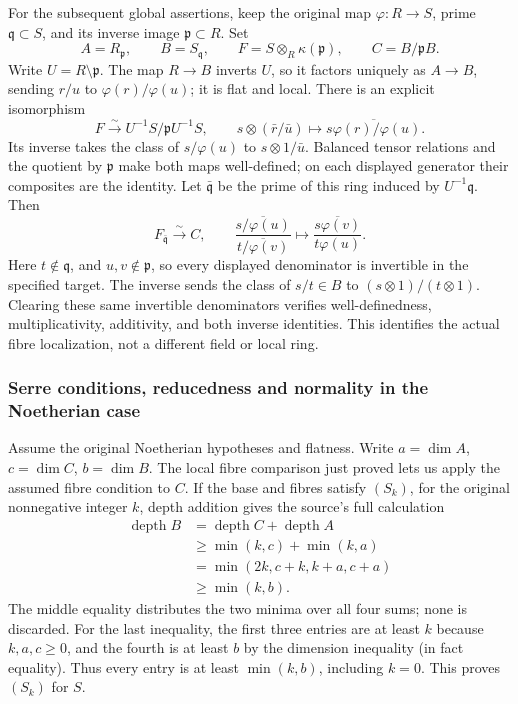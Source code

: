 For the subsequent global assertions, keep the original map \(\varphi:R\to S\), prime \(\mathfrak q\subset S\), and its inverse image \(\mathfrak p\subset R\). Set \[
 A=R_{\mathfrak p},\qquad B=S_{\mathfrak q},\qquad
 F=S\otimes_R\kappa(\mathfrak p),\qquad C=B/\mathfrak pB.
\] Write \(U=R\setminus\mathfrak p\). The map \(R\to B\) inverts \(U\), so it factors uniquely as \(A\to B\), sending \(r/u\) to \(\varphi(r)/\varphi(u)\); it is flat and local. There is an explicit isomorphism \[
 F\xrightarrow{\sim}U^{-1}S/\mathfrak pU^{-1}S,
 \qquad s\otimes(\bar r/\bar u)\longmapsto
 \overline{s\varphi(r)/\varphi(u)}.
\] Its inverse takes the class of \(s/\varphi(u)\) to \(s\otimes1/\bar u\). Balanced tensor relations and the quotient by \(\mathfrak p\) make both maps well-defined; on each displayed generator their composites are the identity. Let \(\bar{\mathfrak q}\) be the prime of this ring induced by \(U^{-1}\mathfrak q\). Then \[
 F_{\bar{\mathfrak q}}\xrightarrow{\sim}C,
 \qquad
 \frac{\overline{s/\varphi(u)}}{\overline{t/\varphi(v)}}
 \longmapsto\overline{\frac{s\varphi(v)}{t\varphi(u)}}.
\] Here \(t\notin\mathfrak q\), and \(u,v\notin\mathfrak p\), so every displayed denominator is invertible in the specified target. The inverse sends the class of \(s/t\in B\) to \((s\otimes1)/(t\otimes1)\). Clearing these same invertible denominators verifies well-definedness, multiplicativity, additivity, and both inverse identities. This identifies the actual fibre localization, not a different field or local ring.

\subsubsection{Serre conditions, reducedness and normality in the Noetherian case}\label{serre-conditions-reducedness-and-normality-in-the-noetherian-case}

Assume the original Noetherian hypotheses and flatness. Write \(a=\dim A\), \(c=\dim C\), \(b=\dim B\). The local fibre comparison just proved lets us apply the assumed fibre condition to \(C\). If the base and fibres satisfy \((S_k)\), for the original nonnegative integer \(k\), depth addition gives the source's full calculation \[
 \begin{aligned}
 \operatorname{depth}B
 &=\operatorname{depth}C+\operatorname{depth}A\\
 &\ge\min(k,c)+\min(k,a)\\
 &=\min(2k,c+k,k+a,c+a)\\
 &\ge\min(k,b).
 \end{aligned}
\] The middle equality distributes the two minima over all four sums; none is discarded. For the last inequality, the first three entries are at least \(k\) because \(k,a,c\ge0\), and the fourth is at least \(b\) by the dimension inequality (in fact equality). Thus every entry is at least \(\min(k,b)\), including \(k=0\). This proves \((S_k)\) for \(S\).

